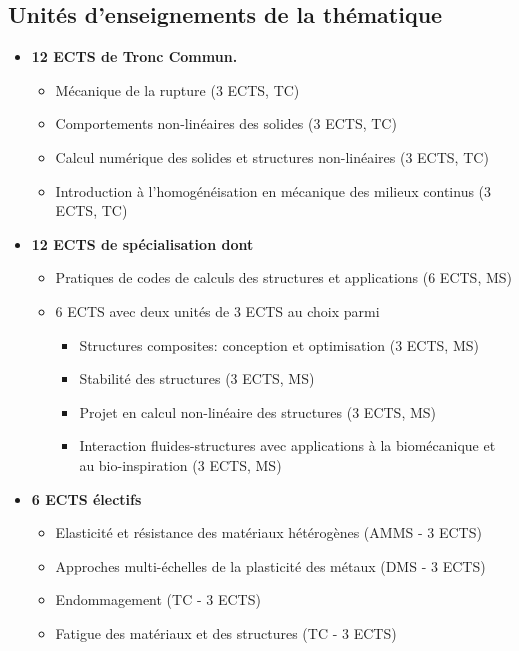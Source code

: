 \documentclass[french,11pt]{article}
\begin{document}
\subsection{Unités d'enseignements de la thématique}
\begin{itemize}
\item
  \textbf{12 ECTS de Tronc Commun.} 

  \begin{itemize}
  \item
    Mécanique de la rupture (3 ECTS, TC)
  \item
    Comportements non-linéaires des solides (3 ECTS, TC)
  \item
    Calcul numérique des solides et structures non-linéaires (3
    ECTS, TC)
  \item
    Introduction à l’homogénéisation en mécanique des milieux continus (3 ECTS, TC)
  \end{itemize}
\item
  \textbf{12 ECTS de spécialisation dont}

  \begin{itemize}
  \item
    Pratiques de codes de calculs des structures et applications (6 ECTS, MS)
  \item
    6 ECTS avec deux unités de 3 ECTS au choix parmi

    \begin{itemize}
    \item
      Structures composites: conception et optimisation (3 ECTS, MS)
    \item
      Stabilité des structures (3 ECTS, MS)
    \item
      Projet en calcul non-linéaire des structures (3 ECTS, MS)
    \item
      Interaction fluides-structures avec applications à la biomécanique et au bio-inspiration (3 ECTS, MS)
    \end{itemize}
  \end{itemize}
\item
  \textbf{6 ECTS électifs}

  \begin{itemize}
  \item
    Elasticité et résistance des matériaux hétérogènes (AMMS - 3 ECTS)
  \item
    Approches multi-échelles de la plasticité des métaux (DMS - 3 ECTS)
  \item
    Endommagement (TC - 3 ECTS)
  \item
    Fatigue des matériaux et des structures (TC - 3 ECTS)
  \end{itemize}
\end{itemize}
\end{document}
